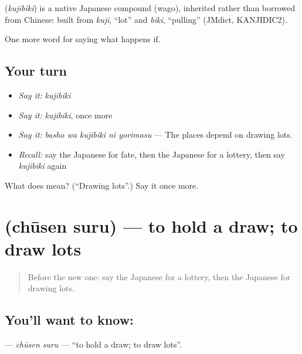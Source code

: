 \begin{cousinweb}
\textbf{} (\emph{kujibiki}) is a native Japanese compound (wago), inherited rather than borrowed from Chinese: built from \emph{kuji}, \textquotedblleft{}lot\textquotedblright{} and \emph{biki}, \textquotedblleft{}pulling\textquotedblright{} (JMdict, KANJIDIC2).
\end{cousinweb}

\begin{grammarlens}[title={What you've built}]
One more word for saying what happens if.
\end{grammarlens}

\subsection*{Your turn}
\begin{itemize}
\raggedright
  \item \emph{Say it:} \emph{kujibiki}
  \item \emph{Say it:} \emph{kujibiki}, once more
  \item \emph{Say it:} \emph{basho wa kujibiki ni yorimasu} — The places depend on drawing lots.
  \item \emph{Recall:} say the Japanese for fate, then the Japanese for a lottery, then say \emph{kujibiki} again
\end{itemize}

\begin{tcolorbox}[breakable,colback=teal!4,colframe=teal!35!black,title={Before you move on}]
What does  mean? (\textquotedblleft{}Drawing lots\textquotedblright{}.) Say it once more.
\end{tcolorbox}
\section[\texorpdfstring{\ja{ちゅうせんする} (chūsen suru)}{ちゅうせんする (chūsen suru)}]{ (chūsen suru) — to hold a draw; to draw lots}

\label{lesson:JA-C509-chuusen-suru}



\begin{quote}
Before the new one: say the Japanese for a lottery, then the Japanese for drawing lots.
\end{quote}

\subsection*{You'll want to know: }
\textbf{} — \emph{chūsen suru} — \textquotedblleft{}to hold a draw; to draw lots\textquotedblright{}.

